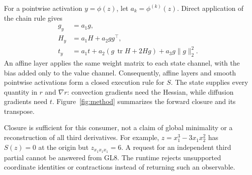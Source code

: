 \documentclass[11pt]{article}
\begin{document}
For a pointwise activation $y=\phi(z)$, let $a_k=\phi^{(k)}(z)$. Direct
application of the chain rule gives
\begin{align}
g_y&=a_1g,\\
H_y&=a_1H+a_2gg^\top,\\
t_y&=a_1t+a_2\left(g\,\operatorname{tr}H+2Hg\right)
          +a_3g\|g\|_2^2.
\label{eq:closure}
\end{align}
An affine layer applies the same weight matrix to each state channel,
with the bias added only to the value channel. Consequently, affine
layers and smooth pointwise activations form a closed execution rule for
$S$. The state supplies every quantity in $r$ and $\nabla r$: convection
gradients need the Hessian, while diffusion gradients need $t$.
Figure~\ref{fig:method} summarizes the forward closure and its transpose.

Closure is sufficient for this consumer, not a claim of global
minimality or a reconstruction of all third derivatives. For example,
$z=x_1^3-3x_1x_2^2$ has $S(z)=0$ at the origin but
$z_{x_1x_1x_1}=6$. A request for an independent third partial cannot be
answered from GL8. The runtime rejects unsupported coordinate identities
or contractions instead of returning such an observable.
\end{document}
